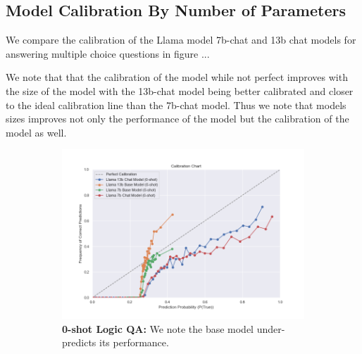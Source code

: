 \documentclass[11pt]{article}
\begin{document}
\subsection{Model Calibration By Number of Parameters}

We compare the calibration of the Llama \cite{touvron2023llama} model 
7b-chat and 13b chat models for answering multiple choice questions in 
figure ... 

We note that that the calibration of the model while not perfect improves with the size of the model with the 13b-chat model being better calibrated and closer to the ideal calibration line than the 7b-chat model. Thus we  note that models sizes improves not only the performance of the model but the calibration of the model as well.

\begin{figure}
     \centering
     \begin{subfigure}[b]{0.60\textwidth}
         \centering \includegraphics[width=1.0\textwidth]{figures/0-shot-logic-qa.png}
         \caption{\textbf{0-shot Logic QA:} We note the base model under-predicts its performance.} 
         \label{fig:0-shot-MMLU}
     \end{subfigure}
     \hfill
     \begin{subfigure}[b]{0.38\textwidth}

\end{subfigure}
\end{figure}
\end{document}
